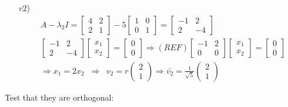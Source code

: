 {\begin{ex}
\begin{itemize}
\begin{align*}
\begin{array}{c}
		1 \\
		-2 
		\end{array} \right)
		\end{align*}\\
		\item[$v2$)] \begin{align*}
		&A - \lambda_2 I = \begin{bmatrix}
		4 & 2 \\
		2 & 1
		\end{bmatrix} - 5\begin{bmatrix}
		1 & 0 \\
		0 & 1
		\end{bmatrix} = \begin{bmatrix}
		-1 & 2 \\
		2 & -4
		\end{bmatrix}\\
		&\begin{bmatrix}
		-1 & 2 \\
		2 & -4
		\end{bmatrix}\begin{bmatrix}
		x_1 \\
		x_2
		\end{bmatrix} = \begin{bmatrix}
		0 \\
		0
		\end{bmatrix} \Rightarrow (REF) \begin{bmatrix}
		-1 & 2 \\
		0 & 0
		\end{bmatrix} \begin{bmatrix}
		x_1 \\
		x_2
		\end{bmatrix} = \begin{bmatrix}
		0 \\
		0
		\end{bmatrix}\\
		&\Rightarrow x_1 = 2x_2 \;\;\Rightarrow\;\; v_2 = r \left( \begin{array}{c}
		2 \\
		1
		\end{array} \right) \Rightarrow \bar{v_2} = \frac{1}{\sqrt{5}}\left(\begin{array}{c}
		2 \\
		1 
		\end{array} \right)
		\end{align*}
	\end{itemize}	
	Test that they are orthogonal:\\

\end{ex}}
